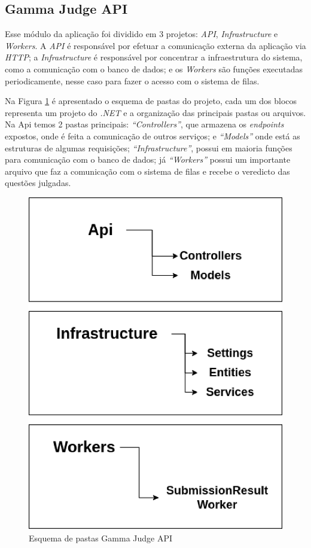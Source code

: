 \subsection{Gamma Judge API}
\label{sec:gammaJudgeApi}

Esse módulo da aplicação foi dividido em 3 projetos: \textit{API}, \textit{Infrastructure} e \textit{Workers}. A \textit{API} é responsável por efetuar a comunicação externa da aplicação via \textit{HTTP}; a \textit{Infrastructure} é responsável por concentrar a infraestrutura do sistema, como a comunicação com o banco de dados; e os \textit{Workers} são funções executadas periodicamente, nesse caso para fazer o acesso com o sistema de filas.

Na Figura \ref{fig:judge_ui_folders} é apresentado o esquema de pastas do projeto, cada um dos blocos representa um projeto do \textit{.NET} e a organização das principais pastas ou arquivos. Na Api temos 2 pastas principais: \textit{“Controllers”}, que armazena os \textit{endpoints} expostos, onde é feita a comunicação de outros serviços; e \textit{“Models”} onde está as estruturas de algumas requisições; \textit{“Infrastructure”}, possui em maioria funções para comunicação com o banco de dados; já  \textit{“Workers”} possui um importante arquivo que faz a comunicação com o sistema de filas e recebe o veredicto das questões julgadas.

\begin{figure}[H]
    \centering
    \includegraphics[keepaspectratio=true,scale=0.5]{figuras/gamma_judge_api_folders.eps}
    \caption{Esquema de pastas Gamma Judge API}
    \label{fig:judge_ui_folders}
\end{figure}

